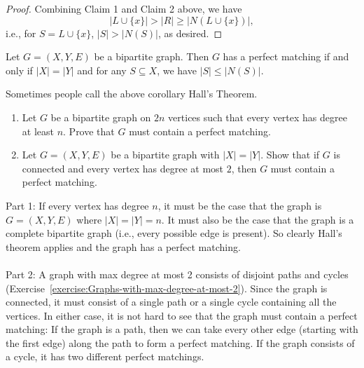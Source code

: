 \begin{flex}
\begin{proof}
Combining Claim 1 and Claim 2 above, we have $$|L \cup \{x\}| > |R| \geq |N(L \cup \{x\})|,$$ i.e., for $S = L \cup \{x\}$, $|S| > |N(S)|$, as desired.

\end{proof}
\end{flex}

\begin{corollary}
\label{corollary:Characterization-of-bipartite-graphs-with-perfect-matchings}
Let $G = (X,Y,E)$ be a bipartite graph. Then $G$ has a perfect matching if and only if $|X| = |Y|$ and for any $S \subseteq X$, we have $|S| \leq |N(S)|$.

\end{corollary}

\begin{note}
\label{note:Halls-Theorem-when-the-two-parts-have-equal-size}
Sometimes people call the above corollary Hall's Theorem.

\end{note}

\begin{flex}
\label{grp:exercise:Practice-with-perfect-matchings}

\begin{exercise}
\label{exercise:Practice-with-perfect-matchings}
\begin{enumerate}
     \item Let $G$ be a bipartite graph on $2n$ vertices such that every vertex has degree at least $n$. Prove that $G$ must contain a perfect matching.
     \item Let $G = (X,Y,E)$ be a bipartite graph with $|X| = |Y|$. Show that if $G$ is connected and every vertex has degree at most $2$, then $G$ must contain a perfect matching.   
\end{enumerate}

\end{exercise}

\begin{solution}
\label{sol:matchings-in-graphs::part}
Part 1: If every vertex has degree $n$, it must be the case that the graph is $G=(X,Y,E)$ where $|X| = |Y| = n$. It must also be the case that the graph is a complete bipartite graph (i.e., every possible edge is present). So clearly Hall's theorem applies and the graph has a perfect matching.
\\\\
\noindent
Part 2: A graph with max degree at most 2 consists of disjoint paths and cycles (Exercise~\ref{exercise:Graphs-with-max-degree-at-most-2}). Since the graph is connected, it must consist of a single path or a single cycle containing all the vertices. In either case, it is not hard to see that the graph must contain a perfect matching: If the graph is a path, then we can take every other edge (starting with the first edge) along the path to form a perfect matching. If the graph consists of a cycle, it has two different perfect matchings. 

\end{solution}
\end{flex}


